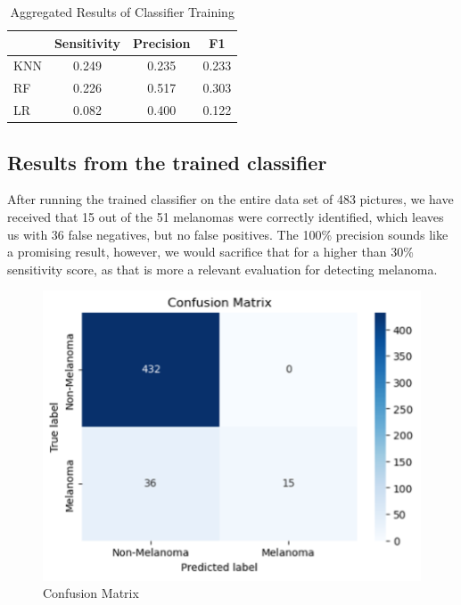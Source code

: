\begin{table}[!htb] %
    \caption{Aggregated Results of Classifier Training}
    \begin{tabular}{l c c c} %
        \toprule
        & \textbf{Sensitivity} & \textbf{Precision} & \textbf{F1} \\
        \midrule
        KNN & 0.249 & 0.235 & 0.233 \\
        RF & 0.226 & 0.517 & 0.303 \\
        LR & 0.082 & 0.400 & 0.122 \\
        \bottomrule
    \end{tabular}
\end{table}

\subsection{{Results from the trained classifier}}
After running the trained classifier on the entire data set of 483 pictures, we have received that 15 out of the 51 melanomas were correctly identified, which leaves us with 36 false negatives, but no false positives. The 100\% precision sounds like a promising result, however, we would sacrifice that for a higher than 30\% sensitivity score, as that is more a relevant evaluation for detecting melanoma.

\begin{figure}[H]
    \centering
    \includegraphics[width=1\linewidth]{ConfusionMatrix.png}
    \caption{Confusion Matrix}
    \label{fig:Confusion Matrix}
\end{figure}